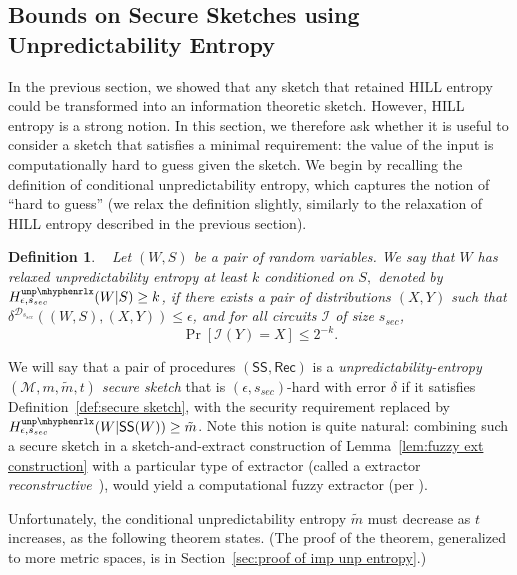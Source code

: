 \documentclass[11pt]{article}
\newcommand{\secref}[1]{\mbox{Section~\ref{#1}}}
\newcommand{\defref}[1]{\mbox{Definition~\ref{#1}}}
\newcommand{\lemref}[1]{\mbox{Lemma~\ref{#1}}}
\newcommand{\class}[1]{{\ensuremath{\mathsf{#1}}}}
\newcommand{\sketch}{\ensuremath{\class{SS}}\xspace}
\newcommand{\rec}{\ensuremath{\class{Rec}}\xspace}
\newcommand{\unprlx}{\ensuremath{\mathtt{unp\mhyphen rlx}}\xspace}
\newtheorem{definition}[theorem]{Definition}
\begin{document}
\subsection{Bounds on Secure Sketches using Unpredictability Entropy}
\label{sec:imp unp sketch}
In the previous section, we showed that any sketch that retained HILL entropy could be transformed into an information theoretic sketch.  However, HILL entropy is a strong notion.  In this section, we therefore ask whether it is useful to consider a sketch that satisfies a minimal requirement: the value of the input is computationally hard to guess given the sketch.  We begin by recalling the definition of conditional unpredictability entropy, which captures the notion of ``hard to guess'' (we relax the definition slightly, similarly to the relaxation of HILL entropy described in the previous section).

\begin{definition}~\cite[Definition 7]{DBLP:conf/eurocrypt/HsiaoLR07}
\label{def:unp entropy}
Let  $(W, S)$ be a pair of random variables. We say that $W$ has \emph{relaxed unpredictability entropy} at least $k$ conditioned on $S,$ denoted by $H^{\unprlx}_{\epsilon, s_{sec}} (W|S) \geq k$, if there exists a pair of distributions $(X, Y)$ such that $\delta^{\mathcal{D}_{s_{sec}}}((W, S),(X, Y))\leq \epsilon$, and for all circuits $\mathcal{I}$ of size $s_{sec}$,
\[
\Pr[\mathcal{I}(Y) = X ] \leq 2^{-k}
.\]
\end{definition}

We will say that a pair of procedures $(\sketch, \rec)$ is a \emph{unpredictability-entropy $(\mathcal{M}, m, \tilde{m}, t)$ secure sketch} that is $(\epsilon, s_{sec})$-hard with error $\delta$ if it satisfies \defref{def:secure sketch}, with the security requirement replaced by $H^{\unprlx}_{\epsilon, s_{sec}}(W| \sketch(W))\geq \tilde{m}$.  
Note this notion is quite natural: combining such a secure sketch in a sketch-and-extract construction of  \lemref{lem:fuzzy ext construction} with a particular type of extractor (called a extractor 
\emph{reconstructive}~\cite{barak-computational}), would yield a computational fuzzy extractor (per \cite[Lemma 6]{DBLP:conf/eurocrypt/HsiaoLR07}).  

Unfortunately, the conditional unpredictability entropy $\tilde{m}$ must decrease as $t$ increases, as the following theorem states.  (The proof of the theorem, generalized to more metric spaces, is in \secref{sec:proof of imp unp entropy}.)
\end{document}

